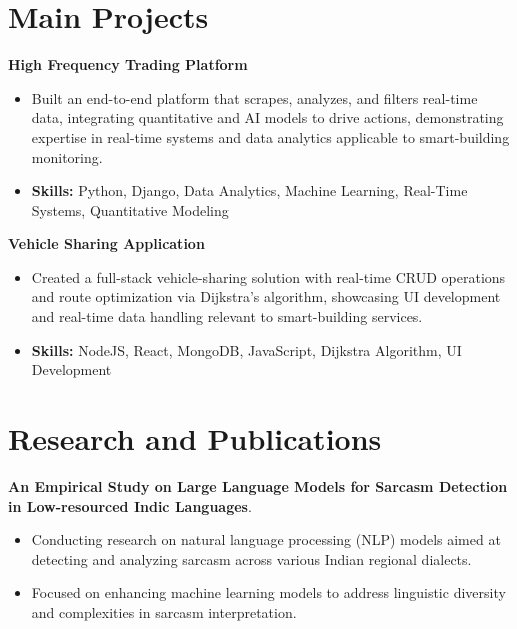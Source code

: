 \documentclass[a4paper,11pt]{article}
\begin{document}
\section{\textbf{Main Projects}}

\vspace{1mm}
  \textbf{High Frequency Trading Platform  }
\vspace{-1.5mm} %
\begin{itemize}
  \item Built an end-to-end platform that scrapes, analyzes, and filters real-time data, integrating quantitative and AI models to drive actions, demonstrating expertise in real-time systems and data analytics applicable to smart-building monitoring.
\vspace{-3mm}
  \item \textbf{Skills:} Python, Django, Data Analytics, Machine Learning, Real-Time Systems, Quantitative Modeling
\end{itemize}


\vspace{1mm}
   \textbf{Vehicle Sharing Application }
\vspace{-1.5mm} %
\begin{itemize}
  \item Created a full-stack vehicle-sharing solution with real-time CRUD operations and route optimization via Dijkstra's algorithm, showcasing UI development and real-time data handling relevant to smart-building services.
\vspace{-3mm}
  \item \textbf{Skills:} NodeJS, React, MongoDB, JavaScript, Dijkstra Algorithm, UI Development
\end{itemize}



\section{\textbf{Research and Publications} \hfill }
\vspace{1mm}
  \textbf{An Empirical Study on Large Language Models for Sarcasm Detection in Low-resourced Indic Languages}.
\vspace{-1mm} %
\begin{itemize}
  \item Conducting research on natural language processing (NLP) models aimed at detecting and analyzing sarcasm across various Indian regional dialects.
\vspace{-3mm}
  \item Focused on enhancing machine learning models to address linguistic diversity and complexities in sarcasm interpretation.
\end{itemize}
\end{document}
